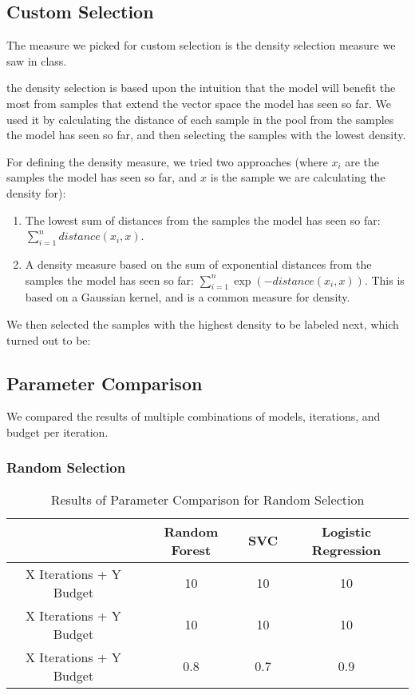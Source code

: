 \documentclass[12pt]{article}
\begin{document}
\subsection{Custom Selection}

The measure we picked for custom selection is the density selection measure we saw in class.

the density selection is based upon the intuition that the model will benefit the most from samples that extend the vector space the model has seen so far. We used it by calculating the distance of each sample in the pool from the samples the model has seen so far, and then selecting the samples with the lowest density.

For defining the density measure, we tried two approaches (where $x_i$ are the samples the model has seen so far, and $x$ is the sample we are calculating the density for):

\begin{enumerate}
    \item The lowest sum of distances from the samples the model has seen so far: $ \sum_{i=1}^{n} distance(x_i, x) $.
    \item A density measure based on the sum of exponential distances from the samples the model has seen so far: $ \sum_{i=1}^{n} \exp(-distance(x_i, x)) $.
    This is based on a Gaussian kernel, and is a common measure for density.
\end{enumerate}

We then selected the samples with the highest density to be labeled next, which turned out to be:

\subsection{Parameter Comparison}

We compared the results of multiple combinations of models, iterations, and budget per iteration.

\subsubsection*{Random Selection}

\begin{table}[H]
    \centering
    \begin{tabular}{|c|c|c|c|}
        \hline
        & Random Forest & SVC & Logistic Regression \\
        \hline
        X Iterations + Y Budget & 10 & 10 & 10 \\
        X Iterations + Y Budget & 10 & 10 & 10 \\
        X Iterations + Y Budget & 0.8 & 0.7 & 0.9 \\
        \hline
    \end{tabular}
    \caption{Results of Parameter Comparison for Random Selection}
\end{table}
\end{document}
